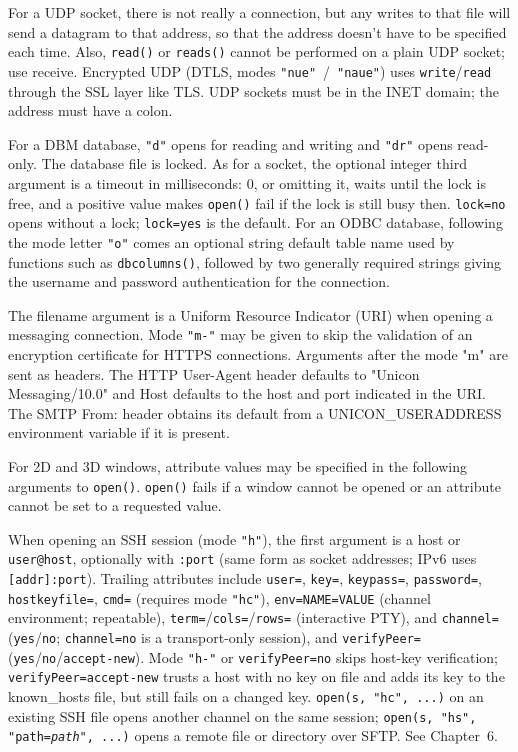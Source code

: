 For a UDP socket, there is not really a connection, but any writes to
that file will send a datagram to that address, so that the address
doesn't have to be specified each time. Also,
\texttt{read()} or \texttt{reads()} cannot be performed on a plain UDP
socket; use receive. Encrypted UDP (DTLS, modes \texttt{"nue"}~/~\texttt{"naue"})
uses \texttt{write}/\texttt{read} through the SSL layer like TLS.
UDP sockets must be in the INET domain; the
address must have a colon. 

For a DBM database, \texttt{"d"} opens for reading and writing and
\texttt{"dr"} opens read-only. The database file is locked. As for a
socket, the optional integer third argument is a timeout in
milliseconds: 0, or omitting it, waits until the lock is free, and a
positive value makes \texttt{open()} fail if the lock is still busy
then. \texttt{lock=no} opens without a lock; \texttt{lock=yes} is the
default.  For an ODBC database, following the mode
letter \texttt{"o"} comes an optional string default table name used
by functions such as \texttt{dbcolumns()}, followed by two generally
required strings giving the username and password authentication for the
connection.

The filename argument is a Uniform Resource Indicator (URI) when opening
a messaging connection. Mode \texttt{"m-"} may be given to skip the
validation of an encryption certificate for HTTPS connections.
Arguments after the mode "m" are sent as headers. The HTTP
User-Agent header defaults to "Unicon
Messaging/10.0" and Host defaults to the host and port
indicated in the URI. The SMTP From: header obtains its default from a
UNICON\_USERADDRESS environment variable if it is present.

For 2D and 3D windows, attribute values may be specified in the
following arguments to \texttt{open()}. \texttt{open()} fails if a
window cannot be opened or an attribute cannot be set to a requested
value.

When opening an SSH session (mode \texttt{"h"}), the first argument is a
host or \texttt{user@host}, optionally with \texttt{:port} (same form as
socket addresses; IPv6 uses \texttt{[addr]:port}). Trailing attributes
include \texttt{user=}, \texttt{key=}, \texttt{keypass=},
\texttt{password=}, \texttt{hostkeyfile=}, \texttt{cmd=} (requires mode
\texttt{"hc"}), \texttt{env=NAME=VALUE} (channel environment; repeatable),
\texttt{term=}/\texttt{cols=}/\texttt{rows=} (interactive PTY), and
\texttt{channel=} (\texttt{yes}/\texttt{no}; \texttt{channel=no} is a
transport-only session), and \texttt{verifyPeer=} (\texttt{yes}/\texttt{no}/\texttt{accept-new}).
Mode \texttt{"h-"} or \texttt{verifyPeer=no} skips host-key verification;
\texttt{verifyPeer=accept-new} trusts a host with no key on file and adds
its key to the known\_hosts file, but still fails on a changed key.
\texttt{open(s, "hc", ...)} on an existing SSH file opens another channel on
the same session; \texttt{open(s, "hs", "path=\textit{path}", ...)}
opens a remote file or directory over SFTP. See Chapter~6.

